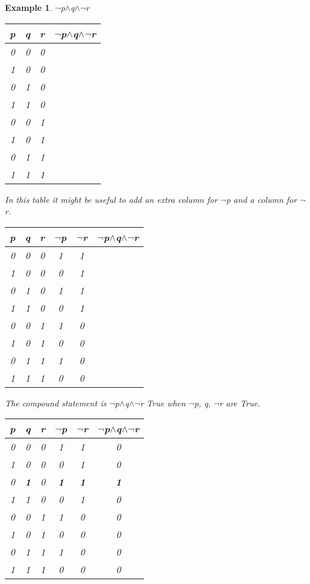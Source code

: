 \documentclass[10pt,a4paper,draft,titlepage,onecolumn]{book}
\newtheorem{example}{Example}[section]
\begin{document}
\begin{example}
{$\neg$}p{$\wedge$}q{$\wedge$}{$\neg$}r

\begin{center}
\begin{tabular}{ |c|c|c|c| }

 \hline
 p & q & r &  {$\neg$}p{$\wedge$}q{$\wedge$}{$\neg$}r \\
 \hline
 0 & 0 & 0 &\\
 1 & 0 & 0 &\\
 0 & 1 & 0 &\\
 1 & 1 & 0 &\\
 0 & 0 & 1 &\\
 1 & 0 & 1 &\\
 0 & 1 & 1 &\\
 1 & 1 & 1 &\\

 \hline
\end{tabular}
\end{center}
In this table it might be useful to add an extra column for  {$\neg$}p and a column for {$\neg$}r.

\begin{center}
\begin{tabular}{ |c|c|c|c|c|c| }

 \hline
 p & q & r &  {$\neg$}p &{$\neg$}r & {$\neg$}p{$\wedge$}q{$\wedge$}{$\neg$}r \\
 \hline
 0 & 0 & 0 & 1 & 1 &\\
 1 & 0 & 0 & 0 & 1 &\\
 0 & 1 & 0 & 1 & 1 &\\
 1 & 1 & 0 & 0 & 1 &\\
 0 & 0 & 1 & 1 & 0 &\\
 1 & 0 & 1 & 0 & 0 &\\
 0 & 1 & 1 & 1 & 0 &\\
 1 & 1 & 1 & 0 & 0 &\\
 \hline
\end{tabular}
\end{center}


The compound statement is {$\neg$}p{$\wedge$}q{$\wedge$}{$\neg$}r True when {$\neg$}p, q, {$\neg$}r are True.

\begin{center}
\begin{tabular}{ |c|c|c|c|c|c| }

 \hline
 p & q & r &  {$\neg$}p &{$\neg$}r & {$\neg$}p{$\wedge$}q{$\wedge$}{$\neg$}r \\
 \hline
 0 & 0 & 0 & 1 & 1 & 0\\
 1 & 0 & 0 & 0 & 1 & 0\\
 0 & \textbf{1} & 0 & \textbf{1} & \textbf{1} & \textbf{1}\\
 1 & 1 & 0 & 0 & 1 & 0\\
 0 & 0 & 1 & 1 & 0 & 0\\
 1 & 0 & 1 & 0 & 0 & 0\\
 0 & 1 & 1 & 1 & 0 & 0\\
 1 & 1 & 1 & 0 & 0 & 0\\
 \hline
\end{tabular}
\end{center}
\end{example}
\end{document}
